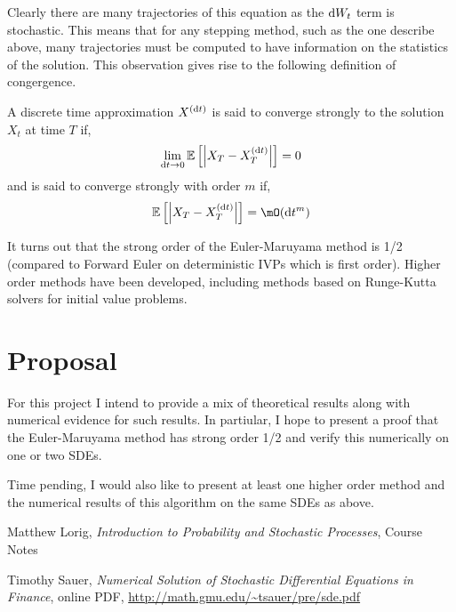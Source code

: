 \documentclass[10pt]{article}
\begin{document}
Clearly there are many trajectories of this equation as the \( \mathrm{d} W_t \) term is stochastic. This means that for any stepping method, such as the one describe above, many trajectories must be computed to have information on the statistics of the solution.
This observation gives rise to the following definition of congergence.
\begin{definition}
A discrete time approximation \( X^{(\mathrm{d} t)} \) is said to converge strongly to the solution \( X_t \) at time \( T \) if,
\begin{align*}
    \lim_{\mathrm{d} t\to 0}\mathbb{E}\left[\left| X_T - X_T^{(\mathrm{d} t)} \right|\right] = 0
\end{align*}
and is said to converge strongly with order \( m \) if,
\begin{align*}
    \bE\left[\left| X_T - X_T^{(\d t)} \right|\right] = \mO(\d t^m)
\end{align*}
\end{definition}

It turns out that the strong order of the Euler-Maruyama method is 1/2 (compared to Forward Euler on deterministic IVPs which is first order).
Higher order methods have been developed, including methods based on Runge-Kutta solvers for initial value problems.

\section{Proposal}
For this project I intend to provide a mix of theoretical results along with numerical evidence for such results. In partiular, I hope to present a proof that the Euler-Maruyama method has strong order 1/2 and verify this numerically on one or two SDEs.

Time pending, I would also like to present at least one higher order method and the numerical results of this algorithm on the same SDEs as above.

\begin{thebibliography}{9}
  Matthew Lorig,
  \textit{Introduction to Probability and Stochastic Processes},
  Course Notes

  Timothy Sauer,
  \textit{Numerical Solution of Stochastic Differential Equations in Finance}, online PDF, \url{http://math.gmu.edu/~tsauer/pre/sde.pdf}

\end{thebibliography}
\end{document}

